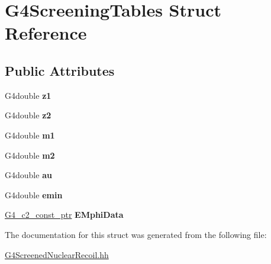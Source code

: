 \hypertarget{structG4ScreeningTables}{\section{G4\-Screening\-Tables Struct Reference}
\label{structG4ScreeningTables}
}
\subsection*{Public Attributes}
\begin{DoxyCompactItemize}
\item 
\hypertarget{structG4ScreeningTables_a3cd98934fae4a889ab4e53f3864cc780}{G4double {\bfseries z1}}\label{structG4ScreeningTables_a3cd98934fae4a889ab4e53f3864cc780}

\item 
\hypertarget{structG4ScreeningTables_a4284a519e4baf655b8d90447fcda3121}{G4double {\bfseries z2}}\label{structG4ScreeningTables_a4284a519e4baf655b8d90447fcda3121}

\item 
\hypertarget{structG4ScreeningTables_a37e3971aed34265cd4934f36c11691f3}{G4double {\bfseries m1}}\label{structG4ScreeningTables_a37e3971aed34265cd4934f36c11691f3}

\item 
\hypertarget{structG4ScreeningTables_a174aca594aef6e3106d5c372f40e0d84}{G4double {\bfseries m2}}\label{structG4ScreeningTables_a174aca594aef6e3106d5c372f40e0d84}

\item 
\hypertarget{structG4ScreeningTables_a448ed1d75168ff3acf294d90eca426a4}{G4double {\bfseries au}}\label{structG4ScreeningTables_a448ed1d75168ff3acf294d90eca426a4}

\item 
\hypertarget{structG4ScreeningTables_a747dce80213771fde265e770670a4d7f}{G4double {\bfseries emin}}\label{structG4ScreeningTables_a747dce80213771fde265e770670a4d7f}

\item 
\hypertarget{structG4ScreeningTables_a79e3cd8918c5e27e1f15e43ac0f42a5b}{\hyperlink{classc2__const__ptr}{G4\-\_\-c2\-\_\-const\-\_\-ptr} {\bfseries E\-Mphi\-Data}}\label{structG4ScreeningTables_a79e3cd8918c5e27e1f15e43ac0f42a5b}

\end{DoxyCompactItemize}


The documentation for this struct was generated from the following file\-:\begin{DoxyCompactItemize}
\item 
\hyperlink{G4ScreenedNuclearRecoil_8hh}{G4\-Screened\-Nuclear\-Recoil.\-hh}\end{DoxyCompactItemize}
